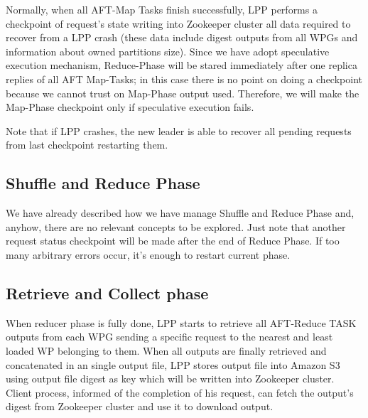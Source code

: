 \documentclass[sigchi]{acmart}
\begin{document}
Normally, when all AFT-Map Tasks finish successfully, LPP performs a checkpoint of request's state writing into Zookeeper cluster all data required to recover from a LPP crash (these data include digest outputs from all WPGs and information about owned partitions size). Since we have adopt speculative execution mechanism, Reduce-Phase will be stared immediately after one replica replies of all AFT Map-Tasks; in this case there is no point on doing a checkpoint because we cannot trust on Map-Phase output used. Therefore, we will make the Map-Phase checkpoint only if speculative execution fails. 

Note that if LPP crashes, the new leader is able to recover all pending requests from last checkpoint restarting them. 

\subsection{Shuffle and Reduce Phase}

We have already described how we have manage Shuffle and Reduce Phase and, anyhow, there are no relevant concepts to be explored. Just note that another request status checkpoint will be made after the end of Reduce Phase. If too many arbitrary errors occur, it's enough to restart current phase.

\subsection{Retrieve and Collect phase}

When reducer phase is fully done, LPP starts to retrieve all AFT-Reduce TASK outputs from each WPG sending a specific request to the nearest and least loaded WP belonging to them. When all outputs are finally retrieved and concatenated in an single output file, LPP stores output file into Amazon S3 using output file digest as key which will be written into Zookeeper cluster. Client process, informed of the completion of his request, can fetch the output's digest from Zookeeper cluster and use it to download output.




\appendix
\end{document}
